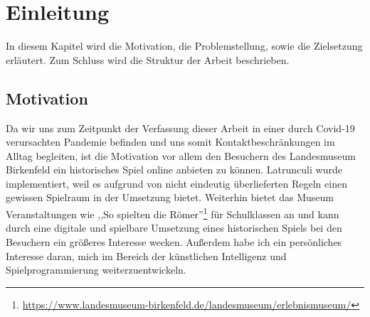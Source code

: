 
\chapter{Einleitung}
\label{ch:Latrunculi}
In diesem Kapitel wird die Motivation, die Problemstellung, sowie die Zielsetzung erläutert. Zum Schluss wird die Struktur der Arbeit beschrieben.



\section{Motivation}
\label{ch:Einleitung:sec:Motivation}
Da wir uns zum Zeitpunkt der Verfassung dieser Arbeit in einer durch Covid-19 verursachten Pandemie befinden und uns somit Kontaktbeschränkungen im Alltag begleiten, ist die Motivation vor allem den Besuchern des Landesmuseum Birkenfeld ein historisches Spiel online anbieten zu können. Latrunculi wurde implementiert, weil es aufgrund von nicht eindeutig überlieferten Regeln einen gewissen Spielraum in der Umsetzung bietet. Weiterhin bietet das Museum Veranstaltungen wie ,,So spielten die Römer''\footnote{\url{https://www.landesmuseum-birkenfeld.de/landesmuseum/erlebnismuseum/}} für Schulklassen an und kann durch eine digitale und spielbare Umsetzung  eines historischen Spiels bei den Besuchern ein größeres Interesse wecken. Außerdem habe ich ein persönliches Interesse daran, mich im Bereich der künstlichen Intelligenz und Spielprogrammierung weiterzuentwickeln.





